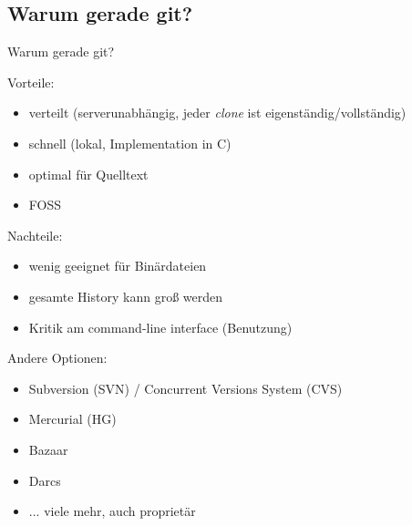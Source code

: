 \subsection{Warum gerade git?}
\begin{frame}{Warum gerade git?}
    \only<+> {
        Vorteile:
        \begin{itemize}
            \item verteilt (serverunabhängig, jeder \emph{clone} ist eigenständig/vollständig)
            \item schnell (lokal, Implementation in C)
            \item optimal für Quelltext
            \item FOSS
        \end{itemize}

        Nachteile:
        \begin{itemize}
            \item wenig geeignet für Binärdateien
            \item gesamte History kann groß werden
            \item Kritik am command-line interface (Benutzung)
        \end{itemize}
    }
    \only<+> {
        Andere Optionen:
        \begin{itemize}
            \item Subversion (SVN) / Concurrent Versions System (CVS)
            \item Mercurial (HG)
            \item Bazaar
            \item Darcs
            \item ... viele mehr, auch proprietär
        \end{itemize}
    }
\end{frame}
